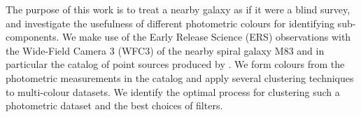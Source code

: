 The purpose of this work is to treat a nearby galaxy as if it were a blind survey, and investigate the
usefulness of different photometric colours for identifying sub-components.
We make use of the Early Release Science (ERS) observations with the Wide-Field Camera 3 (WFC3) of the nearby spiral galaxy M83
and in particular the catalog of point sources produced by \citet{chandar10}.
We form colours from the photometric measurements in the catalog and apply several clustering techniques to multi-colour  datasets.
We identify the optimal process for clustering such a photometric dataset and the best choices of filters.


%
%
